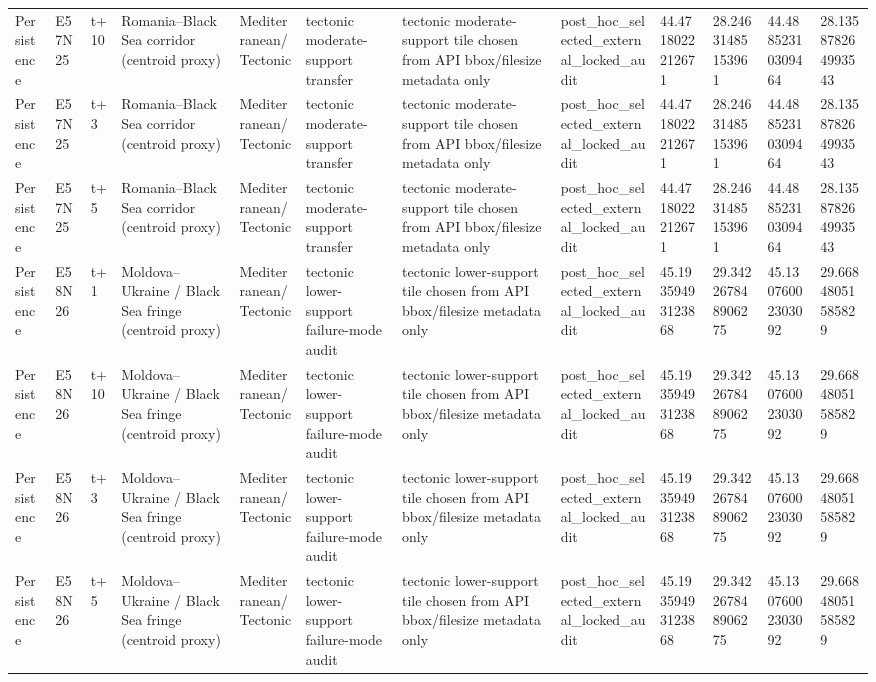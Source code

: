 \begin{landscape}
\begin{longtable}{llllllllllll}
Persistence & E57N25 & t+10 & Romania–Black Sea corridor (centroid proxy) & Mediterranean/Tectonic & tectonic moderate-support transfer & tectonic moderate-support tile chosen from API bbox/filesize metadata only & post\_hoc\_selected\_external\_locked\_audit & 44.4718022212671 & 28.24631485153961 & 44.48852310309464 & 28.135878264993543 \\
Persistence & E57N25 & t+3 & Romania–Black Sea corridor (centroid proxy) & Mediterranean/Tectonic & tectonic moderate-support transfer & tectonic moderate-support tile chosen from API bbox/filesize metadata only & post\_hoc\_selected\_external\_locked\_audit & 44.4718022212671 & 28.24631485153961 & 44.48852310309464 & 28.135878264993543 \\
Persistence & E57N25 & t+5 & Romania–Black Sea corridor (centroid proxy) & Mediterranean/Tectonic & tectonic moderate-support transfer & tectonic moderate-support tile chosen from API bbox/filesize metadata only & post\_hoc\_selected\_external\_locked\_audit & 44.4718022212671 & 28.24631485153961 & 44.48852310309464 & 28.135878264993543 \\
Persistence & E58N26 & t+1 & Moldova–Ukraine / Black Sea fringe (centroid proxy) & Mediterranean/Tectonic & tectonic lower-support failure-mode audit & tectonic lower-support tile chosen from API bbox/filesize metadata only & post\_hoc\_selected\_external\_locked\_audit & 45.19359493123868 & 29.342267848906275 & 45.13076002303092 & 29.66848051585829 \\
Persistence & E58N26 & t+10 & Moldova–Ukraine / Black Sea fringe (centroid proxy) & Mediterranean/Tectonic & tectonic lower-support failure-mode audit & tectonic lower-support tile chosen from API bbox/filesize metadata only & post\_hoc\_selected\_external\_locked\_audit & 45.19359493123868 & 29.342267848906275 & 45.13076002303092 & 29.66848051585829 \\
Persistence & E58N26 & t+3 & Moldova–Ukraine / Black Sea fringe (centroid proxy) & Mediterranean/Tectonic & tectonic lower-support failure-mode audit & tectonic lower-support tile chosen from API bbox/filesize metadata only & post\_hoc\_selected\_external\_locked\_audit & 45.19359493123868 & 29.342267848906275 & 45.13076002303092 & 29.66848051585829 \\
Persistence & E58N26 & t+5 & Moldova–Ukraine / Black Sea fringe (centroid proxy) & Mediterranean/Tectonic & tectonic lower-support failure-mode audit & tectonic lower-support tile chosen from API bbox/filesize metadata only & post\_hoc\_selected\_external\_locked\_audit & 45.19359493123868 & 29.342267848906275 & 45.13076002303092 & 29.66848051585829 \\

\end{longtable}
\end{landscape}

